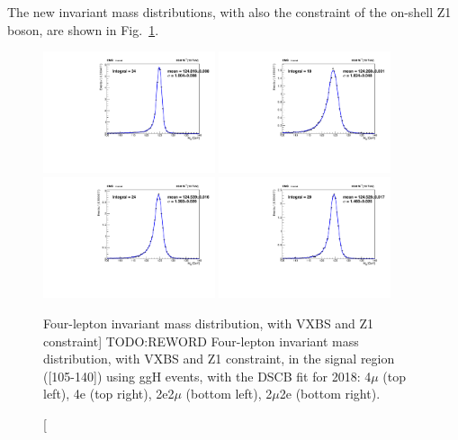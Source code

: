 The new invariant mass distributions, with also the constraint of the on-shell Z1 boson, are shown in 
Fig.~\ref{fig:1D_VXBS_Z1_mass_2018_ggH}.
\begin{figure}[!htbp]
\begin{center}
	\includegraphics[width=0.45\textwidth]{figures/higgsmassmeas/ggH_MassDistribution/1D_VXBS_Z1_mass_2018_ggH_4mu.pdf}
	\includegraphics[width=0.45\textwidth]{figures/higgsmassmeas/ggH_MassDistribution/1D_VXBS_Z1_mass_2018_ggH_4e.pdf}
  	\includegraphics[width=0.45\textwidth]{figures/higgsmassmeas/ggH_MassDistribution/1D_VXBS_Z1_mass_2018_ggH_2e2mu.pdf}
	\includegraphics[width=0.45\textwidth]{figures/higgsmassmeas/ggH_MassDistribution/1D_VXBS_Z1_mass_2018_ggH_2mu2e.pdf}
    \caption
        [Four-lepton invariant mass distribution, with VXBS and Z1 constraint]
        {TODO:REWORD Four-lepton invariant mass distribution, with VXBS and Z1 constraint, in the signal region ([105-140]\GeV) using ggH events, with the DSCB fit for 2018: 4$\mu$ (top left), 4e (top right), 2e2$\mu$ (bottom left), 2$\mu$2e (bottom right).}
\label{fig:1D_VXBS_Z1_mass_2018_ggH}
\end{center}
\end{figure}
